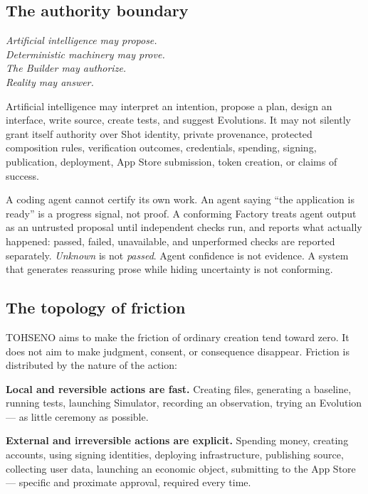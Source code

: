 \documentclass[11pt]{article}
\newenvironment{creed}
  {\begin{center}\begin{minipage}{0.86\textwidth}\itshape\large\centering}
  {\end{minipage}\end{center}\vspace{0.4em}}
\newcommand{\TOH}{TOHSENO}
\begin{document}
\subsection{The authority boundary}

\begin{creed}
Artificial intelligence may propose.\\
Deterministic machinery may prove.\\
The Builder may authorize.\\
Reality may answer.
\end{creed}

Artificial intelligence may interpret an intention, propose a plan,
design an interface, write source, create tests, and suggest Evolutions.
It may not silently grant itself authority over Shot identity, private
provenance, protected composition rules, verification outcomes,
credentials, spending, signing, publication, deployment, App Store
submission, token creation, or claims of success.

A coding agent cannot certify its own work. An agent saying ``the
application is ready'' is a progress signal, not proof. A conforming
Factory treats agent output as an untrusted proposal until independent
checks run, and reports what actually happened: passed, failed,
unavailable, and unperformed checks are reported separately.
\emph{Unknown} is not \emph{passed}. Agent confidence is not evidence. A
system that generates reassuring prose while hiding uncertainty is not
conforming.

\subsection{The topology of friction}

\TOH{} aims to make the friction of ordinary creation tend toward zero.
It does not aim to make judgment, consent, or consequence disappear.
Friction is distributed by the nature of the action:

\textbf{Local and reversible actions are fast.} Creating files,
generating a baseline, running tests, launching Simulator, recording an
observation, trying an Evolution --- as little ceremony as possible.

\textbf{External and irreversible actions are explicit.} Spending money,
creating accounts, using signing identities, deploying infrastructure,
publishing source, collecting user data, launching an economic object,
submitting to the App Store --- specific and proximate approval,
required every time.
\end{document}
